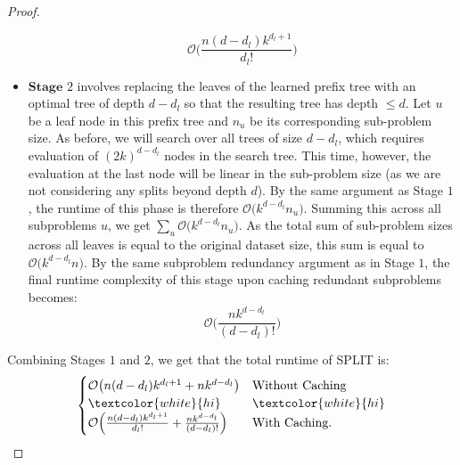 \begin{proof}
\begin{itemize}
    \begin{equation}
        \mathcal{O}\Big(\frac{n(d-d_l)k^{d_l+1}}{d_l!}\Big)
    \end{equation}
    \item $\textbf{Stage $2$}$ involves replacing the leaves of the learned prefix tree with an optimal tree of depth $d - d_l$ so that the resulting tree has depth $\leq d$. Let $u$ be a leaf node in this prefix tree and $n_u$ be its corresponding sub-problem size. As before, we will search over all trees of size $d-d_l$, which requires evaluation of $(2k)^{d-d_l}$ nodes in the search tree. This time, however, the evaluation at the last node will be linear in the sub-problem size (as we are not considering any splits beyond depth $d$). By the same argument as Stage $1$, the runtime of this phase is therefore $\mathcal{O}\big(k^{d-d_l}n_u\big)$. Summing this across all subproblems $u$, we get $\sum_{u} \mathcal{O}\big(k^{d-d_l}n_u\big)$. As the total sum of sub-problem sizes across all leaves is equal to the original dataset size, this sum is equal to $\mathcal{O}\big(k^{d-d_l}n\big)$. By the same subproblem redundancy argument as in Stage $1$, the final runtime complexity of this stage upon caching redundant subproblems becomes:
    \begin{equation}
        \mathcal{O}\Big(\frac{nk^{d-d_l}}{(d-d_l)!}\Big)
    \end{equation}
\end{itemize}
Combining Stages $1$ and $2$, we get that the total runtime of SPLIT is: 
\begin{align}
    \begin{cases}
        \mathcal{O}\big(n(d-d_l)k^{d_l+1}+ nk^{d-d_l}\big) & \textrm{Without Caching}\\ 
        \textcolor{white}{hi} & \textcolor{white}{hi} \\
         \mathcal{O}\Big(\frac{n(d-d_l)k^{d_l+1}}{d_l!} + \frac{nk^{d - d_l}}{(d-d_l)!}\Big) & \textrm{With Caching.}
    \end{cases}
\end{align}

\end{proof}

